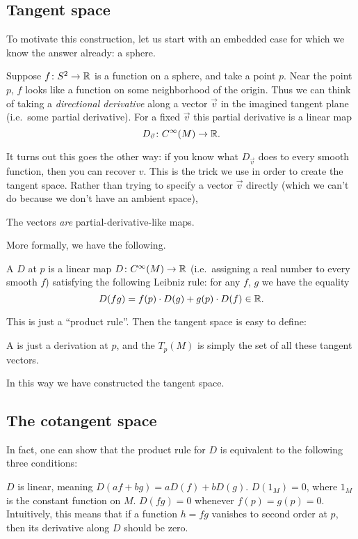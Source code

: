\subsection{Tangent space}
To motivate this construction, let us start
with an embedded case for which we know the answer already:
a sphere.

Suppose $f \colon S^2 \to \mathbb R$ is a
function on a sphere, and take a point $p$.
Near the point $p$, $f$ looks like a function
on some neighborhood of the origin.
Thus we can think of taking a \emph{directional derivative}
along a vector $\vec v$ in the imagined tangent plane
(i.e.\ some partial derivative).
For a fixed $\vec v$ this partial derivative is a linear map
\[ D_{\vec v} \colon C^\infty(M) \to \mathbb R. \]

It turns out this goes the other way:
if you know what $D_{\vec v}$ does to every smooth function,
then you can recover $v$.
This is the trick we use in order to create the tangent space.
Rather than trying to specify a vector $\vec v$ directly
(which we can't do because we don't have an ambient space),
\begin{moral}
	The vectors \emph{are} partial-derivative-like maps.
\end{moral}
More formally, we have the following.
\begin{definition}
	A  $D$ at $p$ is a linear map
	$D \colon C^\infty(M) \to \mathbb R$
	(i.e.\ assigning a real number to every smooth $f$)
	satisfying the following Leibniz rule:
	for any $f$, $g$ we have the equality
	\[ D(fg) = f(p) \cdot D(g) + g(p) \cdot D(f) \in \mathbb R. \]
\end{definition}
This is just a ``product rule''.
Then the tangent space is easy to define:
\begin{definition}
	A  is just a derivation at $p$, and
	the  $T_p(M)$ is simply
	the set of all these tangent vectors.
\end{definition}
In this way we have constructed the tangent space.

\subsection{The cotangent space}
In fact, one can show that the product rule
for $D$ is equivalent to the following three conditions:
\begin{enumerate}
	\ii $D$ is linear, meaning $D(af+bg) = a D(f) + b D(g)$.
	\ii $D(1_M) = 0$, where $1_M$ is the constant function on $M$.
	\ii $D(fg) = 0$ whenever $f(p) = g(p) = 0$.
	Intuitively, this means that if a function $h = fg$
	vanishes to second order at $p$,
	then its derivative along $D$ should be zero. 
\end{enumerate}

